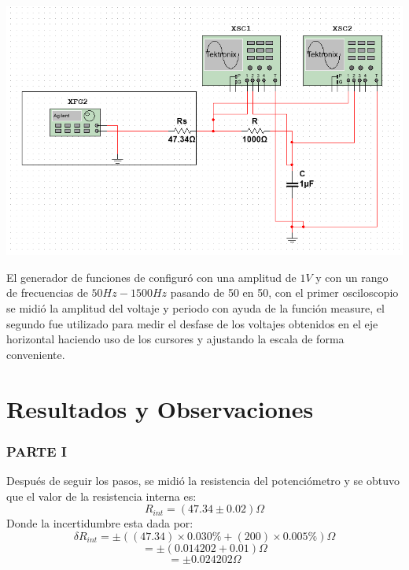 \documentclass[DIV=calc, paper=a4, fontsize=11pt]{scrartcl}
\newenvironment{Figura}
  {\par\medskip\noindent\minipage{\linewidth}}
  {\endminipage\par\medskip}
\begin{document}
\begin{multicols}{2}
\begin{Figura}
    \centering
    \includegraphics[width=0.9 \textwidth]{2.PNG}
    \label{fig}
\end{Figura}

El generador de funciones de configuró con una amplitud de $1V$ y con un rango de frecuencias de $50 Hz - 1500Hz$ pasando de 50 en 50, con el primer osciloscopio se midió la amplitud del voltaje y periodo con ayuda de la función measure, el segundo fue utilizado para medir el desfase de los voltajes obtenidos en el eje horizontal haciendo uso de los cursores y ajustando la escala de forma conveniente.












\section*{Resultados y Observaciones}
\subsubsection*{PARTE I}
Después de seguir los pasos, se midió la resistencia del potenciómetro y se obtuvo que el valor de la resistencia interna es:
$$R_{int}=(47.34\pm0.02)\Omega$$
Donde la incertidumbre esta dada por:
$$\delta R_{int} = \pm((47.34)\times0.030\%+(200)\times0.005\%)\Omega$$
$$ = \pm(0.014202+0.01)\Omega$$
$$ = \pm0.024202\Omega$$


\end{multicols}
\end{document}
